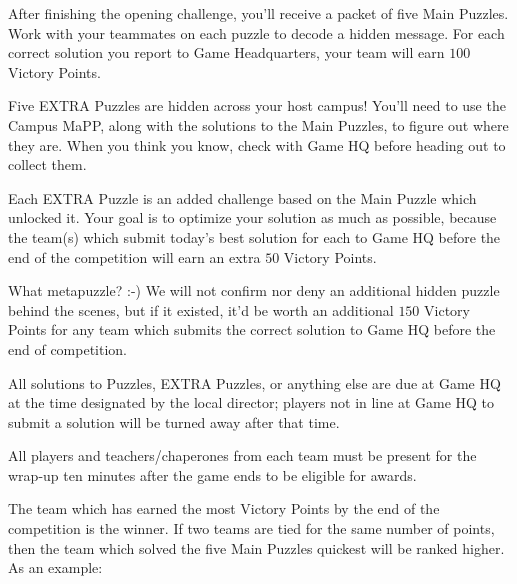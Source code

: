 \begin{rules}
After finishing the opening challenge, you'll receive a packet of
five Main Puzzles. Work
with your teammates on each puzzle to decode a hidden message. For each
correct solution you report to Game Headquarters, your team will earn \(100\)
Victory Points.

\vfill

\newpage


Five EXTRA Puzzles are hidden across your host campus! You'll need to
use the Campus MaPP, along with the solutions to the Main Puzzles, to
figure out where they are. When you think you know, check with Game HQ before
heading out to collect them.

Each EXTRA Puzzle is an added challenge based on the Main Puzzle which unlocked
it. Your goal is to optimize your solution as much as possible, because
the team(s) which submit today's best solution for each
to Game HQ before the end of the
competition will earn an extra \(50\) Victory Points.

\vfill


What metapuzzle? :-) We will not confirm nor deny an additional
hidden puzzle behind the scenes,
but if it existed, it'd be worth an additional \(150\) Victory Points for any
team which submits the correct solution to Game HQ before the end of
competition.

\vfill


All solutions to Puzzles, EXTRA Puzzles, or anything else
are due at Game HQ at the time designated by the local director;
players not in line at Game HQ to submit a
solution will be turned away after that time.

All players and teachers/chaperones
from each team must be present for the wrap-up ten minutes
after the game ends to be eligible for awards.

\vfill


The team which has earned the most Victory Points by the end of the competition
is the winner. If two teams are tied for the same number of points,
then the team which solved the five Main Puzzles
quickest will be ranked higher. As an example:


\end{rules}

